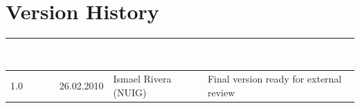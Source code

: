\documentclass{fast_latex}
\newcommand\authorOne{Ismael Rivera, NUIG}
\newcommand\authorTwo{Albert Z\"undorf, UniKassel}
\newcommand\authorThree{Author 3}
\newcommand\authorFour{Author 4}
\begin{document}
\newpage
%
%
%
%
%
%
%



\section*{Version History}

\begin{small}
\begin{tabular}{|l|l|l|p{7.5cm}|}
\hline
\rowcolor{fast@lightgrey}\textcolor{white}{\textbf{Rev. No.}} &
                            \textcolor{white}{\textbf{Date}} &
                            \textcolor{white}{\textbf{Author (Partner)}} &
							\textcolor{white}{\textbf{Change description}}\\ \hline
1.0 & 26.02.2010 & Ismael Rivera (NUIG) & Final version ready for external review \\ \hline
\end{tabular}
\end{small}
\end{document}
